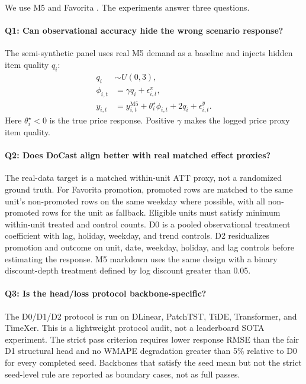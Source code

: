 \documentclass[11pt]{article}
\begin{document}
We use M5 \citep{makridakis2022m5} and Favorita
\citep{favorita2018kaggle}. The experiments answer three questions.

\paragraph{Q1: Can observational accuracy hide the wrong scenario response?}
The semi-synthetic panel uses real M5 demand as a baseline and injects hidden
item quality $q_i$:
\begin{align}
  q_i &\sim U(0,3),\\
  \phi_{i,t} &= \gamma q_i + \epsilon^\pi_{i,t},\\
  y_{i,t} &= y^{\mathrm{M5}}_{i,t}
    + \theta_i^\star\phi_{i,t}
    + 2q_i + \epsilon^y_{i,t}.
\end{align}
Here $\theta_i^\star<0$ is the true price response. Positive $\gamma$ makes the
logged price proxy item quality.

\paragraph{Q2: Does DoCast align better with real matched effect proxies?}
The real-data target is a matched within-unit ATT proxy, not a randomized
ground truth. For Favorita promotion, promoted rows are matched to the same
unit's non-promoted rows on the same weekday where possible, with all
non-promoted rows for the unit as fallback. Eligible units must satisfy minimum
within-unit treated and control counts. D0 is a pooled observational treatment
coefficient with lag, holiday, weekday, and trend controls. D2 residualizes
promotion and outcome on unit, date, weekday, holiday, and lag controls before
estimating the response. M5 markdown uses the same design with a binary
discount-depth treatment defined by log discount greater than 0.05.

\paragraph{Q3: Is the head/loss protocol backbone-specific?}
The D0/D1/D2 protocol is run on DLinear, PatchTST, TiDE, Transformer, and TimeXer. This is a
lightweight protocol audit, not a leaderboard SOTA experiment. The strict pass
criterion requires lower response RMSE than the fair D1 structural head and no
WMAPE degradation greater than 5\% relative to D0 for every completed seed.
Backbones that satisfy the seed mean but not the strict seed-level rule are
reported as boundary cases, not as full passes.
\end{document}
